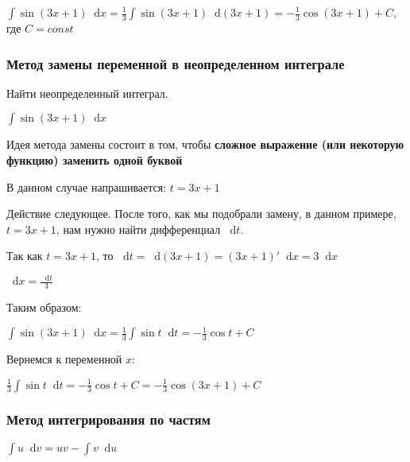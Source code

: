 \documentclass{article}
\newcommand*\diff{\mathop{}\!\mathrm{d}}
\begin{document}
$\int \sin (3x + 1) \diff x = \frac{1}{3} \int \sin (3x + 1) \diff (3 x + 1) = -\frac{1}{3} \cos (3 x + 1) + C$, где $C = const$

\subsubsection{Метод замены переменной в неопределенном интеграле}

Найти неопределенный интеграл. 

$\int \sin (3x + 1) \diff x$

\hfill

Идея метода замены состоит в том, чтобы \textbf{сложное выражение (или некоторую функцию) заменить одной буквой}

В данном случае напрашивается: $t = 3 x + 1$

\hfill

Действие следующее. После того, как мы подобрали замену, в данном примере, $t = 3 x + 1$, нам нужно найти дифференциал $\diff t$.

Так как $t = 3 x + 1$, то $\diff t = \diff (3x + 1) = (3x + 1)' \diff x = 3 \diff x$

$\diff x = \frac{\diff t}{3}$

\hfill

Таким образом:

$\int \sin (3x + 1) \diff x = \frac{1}{3} \int \sin t \diff t = - \frac{1}{3} \cos t + C$

Вернемся к переменной $x$:

$\frac{1}{3} \int \sin t \diff t = - \frac{1}{3} \cos t + C = -\frac{1}{3} \cos (3x + 1) + C$

\subsubsection{Метод интегрирования по частям}

$\int u \diff v = u v - \int v \diff u$
\end{document}
